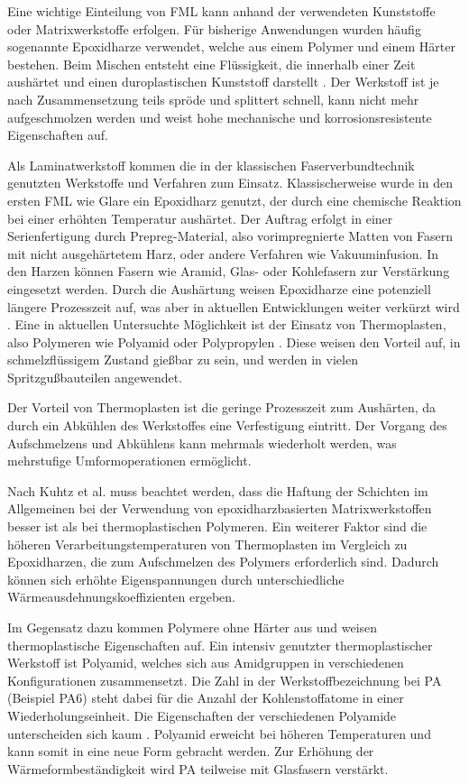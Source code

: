 
Eine wichtige Einteilung von FML kann anhand der verwendeten Kunststoffe oder Matrixwerkstoffe erfolgen.
Für bisherige Anwendungen wurden häufig sogenannte Epoxidharze verwendet, welche aus einem Polymer und einem Härter bestehen.
Beim Mischen entsteht eine Flüssigkeit, die innerhalb einer Zeit aushärtet und einen duroplastischen Kunststoff darstellt \cite{Dornbusch.2015}.
Der Werkstoff ist je nach Zusammensetzung teils spröde und splittert schnell, kann nicht mehr aufgeschmolzen werden und weist hohe mechanische und korrosionsresistente Eigenschaften auf.

Als Laminatwerkstoff kommen die in der klassischen Faserverbundtechnik genutzten Werkstoffe und Verfahren zum Einsatz.
Klassischerweise wurde in den ersten FML wie Glare ein Epoxidharz genutzt, der durch eine chemische Reaktion bei einer erhöhten Temperatur aushärtet.
Der Auftrag erfolgt in einer Serienfertigung durch Prepreg-Material, also vorimpregnierte Matten von Fasern mit nicht ausgehärtetem Harz, oder andere Verfahren wie Vakuuminfusion.
In den Harzen können Fasern wie Aramid, Glas- oder Kohlefasern zur Verstärkung eingesetzt werden.
Durch die Aushärtung weisen Epoxidharze eine potenziell längere Prozesszeit auf, was aber in aktuellen Entwicklungen weiter verkürzt wird \cite{Lakho.2017}.
Eine in aktuellen Untersuchte Möglichkeit ist der Einsatz von Thermoplasten, also Polymeren wie Polyamid oder Polypropylen \cite{Flock.2012}.
Diese weisen den Vorteil auf, in schmelzflüssigem Zustand gießbar zu sein, und werden in vielen Spritzgußbauteilen angewendet. \cite{ehrenstein.2003}

Der Vorteil von Thermoplasten ist die geringe Prozesszeit zum Aushärten, da durch ein Abkühlen des Werkstoffes eine Verfestigung eintritt.
Der Vorgang des Aufschmelzens und Abkühlens kann mehrmals wiederholt werden, was mehrstufige Umformoperationen ermöglicht.

Nach Kuhtz et al. \cite{Kuhtz.2019} muss beachtet werden, dass die Haftung der Schichten im Allgemeinen bei der Verwendung von epoxidharzbasierten Matrixwerkstoffen besser ist als bei thermoplastischen Polymeren.
Ein weiterer Faktor sind die höheren Verarbeitungstemperaturen von Thermoplasten im Vergleich zu Epoxidharzen, die zum Aufschmelzen des Polymers erforderlich sind.
Dadurch können sich erhöhte Eigenspannungen durch unterschiedliche Wärmeausdehnungskoeffizienten ergeben.

Im Gegensatz dazu kommen Polymere ohne Härter aus und weisen thermoplastische Eigenschaften auf.
Ein intensiv genutzter thermoplastischer Werkstoff ist Polyamid, welches sich aus Amidgruppen in verschiedenen Konfigurationen zusammensetzt.
Die Zahl in der Werkstoffbezeichnung bei PA (Beispiel PA6) steht dabei für die Anzahl der Kohlenstoffatome in einer Wiederholungseinheit.
Die Eigenschaften der verschiedenen Polyamide unterscheiden sich kaum \cite{Flock.2012}.
Polyamid erweicht bei höheren Temperaturen und kann somit in eine neue Form gebracht werden.
Zur Erhöhung der Wärmeformbeständigkeit wird PA teilweise mit Glasfasern verstärkt. \cite{Baur.2007}

